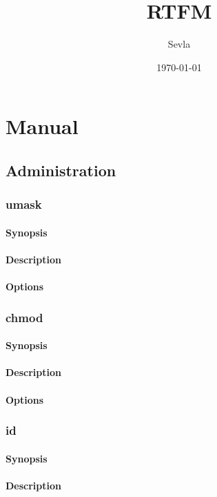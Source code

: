 \documentclass[a4paper, 10pt, onecolumn, openright, oneside]{book}
\title{RTFM}
\author{Sevla}
\date{\today}
\begin{document}
\maketitle
{}
\setcounter{tocdepth}{1}
\tableofcontents

\part{Manual}
	\chapter{Administration}
		\section{umask}
			\subsection{Synopsis}
			\subsection{Description}
			\subsection{Options}
		\section{chmod}
			\subsection{Synopsis}
			\subsection{Description}
			\subsection{Options}
		\section{id}
			\subsection{Synopsis}
			\subsection{Description}
\end{document}
